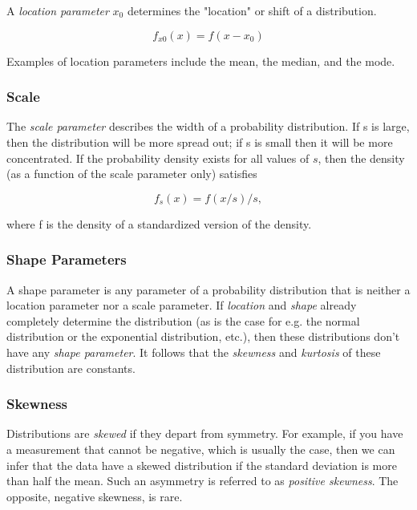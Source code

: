 A \emph{location parameter} $x_0$  determines the "location" or shift of a distribution.

\begin{equation*}
  f_{x0}(x)=f(x-x_0)
\end{equation*}

Examples of location parameters include the mean, the median, and the mode.

\subsubsection{Scale}

The \emph{scale parameter} describes the width of a probability distribution.  If s is large, then the distribution will be more spread out; if s is small then it will be more concentrated. If the probability density exists for all values of $s$, then the density (as a function of the scale parameter only) satisfies

\begin{equation*}
   f_s(x) = f(x/s)/s,
\end{equation*}

where f is the density of a standardized version of the density.

\subsubsection{Shape Parameters}

A shape parameter is any parameter of a probability distribution that is neither a location parameter nor a scale parameter. If \emph{location }and \emph{shape} already completely determine the distribution (as is the case for e.g. the normal distribution or the exponential distribution, etc.), then these distributions don't have any \emph{shape parameter}. It follows that the \emph{skewness }and \emph{kurtosis} of these distribution are constants.


\subsubsection{Skewness}

Distributions are \emph{skewed} if they depart from symmetry. For example, if you have a measurement that cannot be negative, which is usually the case, then we can infer that the data have a skewed distribution if the standard deviation is more than half the mean. Such an asymmetry is referred to as \emph{positive skewness}. The opposite, negative skewness, is rare.


